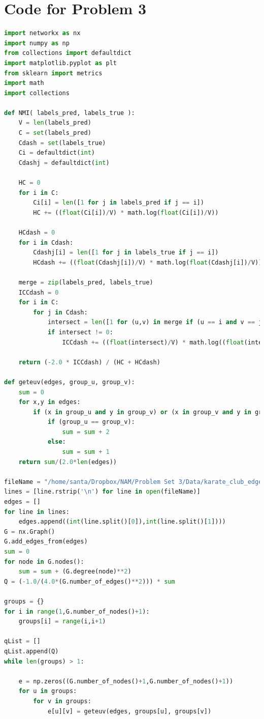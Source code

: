 \documentclass{article}
\begin{document}
\section*{Code for Problem 3}
\begin{lstlisting}[language=Python, breaklines=true]
import networkx as nx
import numpy as np
from collections import defaultdict
import matplotlib.pyplot as plt
from sklearn import metrics
import math
import collections

def NMI( labels_pred, labels_true ):
    V = len(labels_pred)
    C = set(labels_pred)
    Cdash = set(labels_true)
    Ci = defaultdict(int)
    Cdashj = defaultdict(int)
    
    HC = 0
    for i in C:
        Ci[i] = len([1 for j in labels_pred if j == i])
        HC += ((float(Ci[i])/V) * math.log(float(Ci[i])/V))
    
    HCdash = 0
    for i in Cdash:
        Cdashj[i] = len([1 for j in labels_true if j == i])
        HCdash += ((float(Cdashj[i])/V) * math.log(float(Cdashj[i])/V))
    
    merge = zip(labels_pred, labels_true)
    ICCdash = 0
    for i in C:
        for j in Cdash:
            intersect = len([1 for (u,v) in merge if (u == i and v == j)])
            if intersect != 0:
                ICCdash += ((float(intersect)/V) * math.log((float(intersect) * V)/(Ci[i] * Cdashj[j])) )
    
    return (-2.0 * ICCdash) / (HC + HCdash)

def geteuv(edges, group_u, group_v):
    sum = 0
    for x,y in edges:
        if (x in group_u and y in group_v) or (x in group_v and y in group_u):
            if (group_u == group_v):
                sum = sum + 2
            else:
                sum = sum + 1
    return sum/(2.0*len(edges))

fileName = "/home/santa/Dropbox/NAM/Problem Set 3/Data/karate_club_edges.txt"
lines = [line.rstrip('\n') for line in open(fileName)]
edges = []
for line in lines:
    edges.append((int(line.split()[0]),int(line.split()[1])))
G = nx.Graph()
G.add_edges_from(edges)
sum = 0   
for node in G.nodes():
    sum = sum + (G.degree(node)**2)
Q = (-1.0/(4.0*(G.number_of_edges()**2))) * sum

groups = {}
for i in range(1,G.number_of_nodes()+1):
    groups[i] = range(i,i+1)

qList = []
qList.append(Q)
while len(groups) > 1:
    
    e = np.zeros((G.number_of_nodes()+1,G.number_of_nodes()+1))
    for u in groups:
        for v in groups:
            e[u][v] = geteuv(edges, groups[u], groups[v])


\end{lstlisting}
\end{document}
